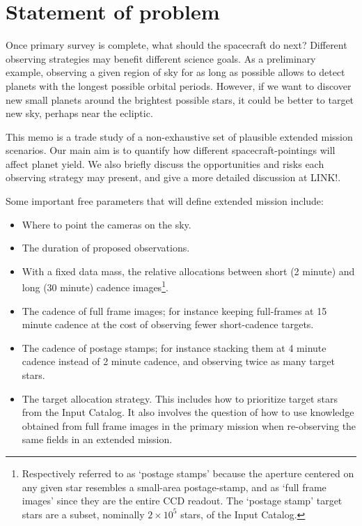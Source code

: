 \section{Statement of problem}
\label{sec:statement_of_problem}
Once \tesss primary survey is complete, what should the spacecraft do next? 
Different observing strategies may benefit different science goals. 
As a preliminary example, observing a given region of sky for as long as possible allows \tess to detect planets with the longest possible orbital periods.
However, if we want to discover new small planets around the brightest possible stars, it could be better to target new sky, perhaps near the ecliptic.


This memo is a trade study of a non-exhaustive set of plausible extended mission scenarios. 
Our main aim is to quantify how different spacecraft-pointings will affect \tesss planet yield.
We also briefly discuss the opportunities and risks each observing strategy may present, and give a more detailed discussion at LINK!.

Some important free parameters that will define \tesss extended mission include:
\begin{itemize}
	\item Where to point the cameras on the sky.
	\item The duration of proposed observations.
	\item With a fixed data mass, the relative allocations between short (2 minute) and long (30 minute) cadence images\footnote{Respectively referred to as `postage stamps' because the aperture centered on any given star resembles a small-area postage-stamp, and as `full frame images' since they are the entire CCD readout. The `postage stamp' target stars are a subset, nominally $2\times 10^5$ stars, of the \tess Input Catalog.}. 
	\item The cadence of full frame images; for instance keeping full-frames at 15 minute cadence at the cost of observing fewer short-cadence targets.
	\item The cadence of postage stamps; for instance stacking them at 4 minute cadence instead of 2 minute cadence, and observing twice as many target stars.
	\item The target allocation strategy. This includes how to prioritize target stars from the \tess Input Catalog. It also involves the question of how to use knowledge obtained from full frame images in the primary mission when re-observing the same fields in an extended mission.
\end{itemize}

